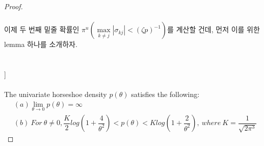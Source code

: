 \begin{proof}
\\
\\
이제 두 번째 밑줄 확률인 $\pi^u(\max\limits_{k \neq j}|\sigma_{kj}|< (\zeta p)^{-1})$를 계산할 건데, 먼저 이를 위한 lemma 하나를 소개하자.\\
\\
\ \\
\noindent
[lemma 1 in [12]]\\
\\
The univariate horseshoe density $p(\theta)$ satisfies the following:
\begin{align*}
    &(a) \lim\limits_{\theta \rightarrow 0}p(\theta) = \infty\\
    &(b) \ For\ \theta \neq 0, \dfrac{K}{2}log\left(1+\dfrac{4}{\theta^2}\right)<p(\theta)<Klog\left(1+\dfrac{2}{\theta^2}\right), \ where\ K=\dfrac{1}{\sqrt{2\pi^3}}
\end{align*} 


\end{proof}
